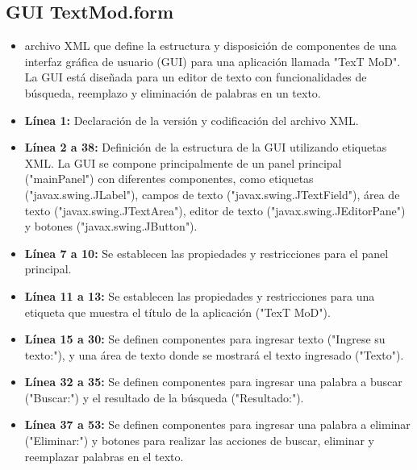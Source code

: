 \documentclass{article}
\begin{document}
\subsection{GUI TextMod.form}
\begin{itemize}	
	\item archivo XML que define la estructura y disposición de componentes de una interfaz gráfica de usuario (GUI) para una aplicación llamada "TexT MoD". La GUI está diseñada para un editor de texto con funcionalidades de búsqueda, reemplazo y eliminación de palabras en un texto.

\end{itemize}	
	
\begin{itemize}
	\item \textbf{Línea 1:} Declaración de la versión y codificación del archivo XML.

	\item \textbf{Línea 2 a 38:} Definición de la estructura de la GUI utilizando etiquetas XML. La GUI se compone principalmente de un panel principal ("mainPanel") con diferentes componentes, como etiquetas ("javax.swing.JLabel"), campos de texto ("javax.swing.JTextField"), área de texto ("javax.swing.JTextArea"), editor de texto ("javax.swing.JEditorPane") y botones ("javax.swing.JButton").

	\item \textbf{Línea 7 a 10:} Se establecen las propiedades y restricciones para el panel principal.

	\item \textbf{Línea 11 a 13:} Se establecen las propiedades y restricciones para una etiqueta que muestra el título de la aplicación ("TexT MoD").

	\item \textbf{Línea 15 a 30:} Se definen componentes para ingresar texto ("Ingrese su texto:"), y una área de texto donde se mostrará el texto ingresado ("Texto").

	\item \textbf{Línea 32 a 35:} Se definen componentes para ingresar una palabra a buscar ("Buscar:") y el resultado de la búsqueda ("Resultado:").

	\item \textbf{Línea 37 a 53:} Se definen componentes para ingresar una palabra a eliminar ("Eliminar:") y botones para realizar las acciones de buscar, eliminar y reemplazar palabras en el texto.
\end{itemize}
\end{document}
